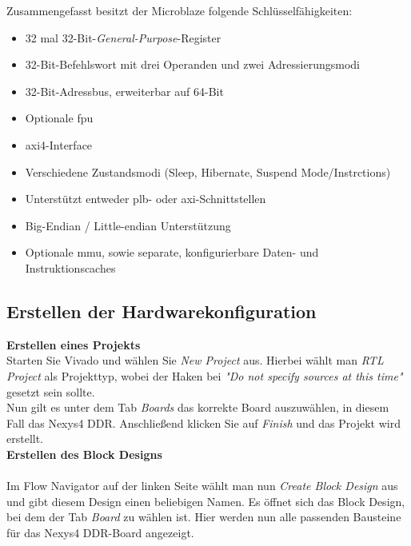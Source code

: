 Zusammengefasst besitzt der Microblaze folgende Schlüsselfähigkeiten:
\begin{itemize}
  \item 32 mal 32-Bit-\emph{General-Purpose}-Register
  \item 32-Bit-Befehlswort mit drei Operanden und zwei Adressierungsmodi
  \item 32-Bit-Adressbus, erweiterbar auf 64-Bit
  \item Optionale \ac{fpu}
  \item \ac{axi}4-Interface
  \item Verschiedene Zustandsmodi (Sleep, Hibernate, Suspend Mode/Instrctions)
  \item Unterstützt entweder \ac{plb}- oder \ac{axi}-Schnittstellen
  \item Big-Endian / Little-endian Unterstützung
  \item Optionale \ac{mmu}, sowie separate, konfigurierbare Daten- und Instruktionscaches
\end{itemize}


\subsection{Erstellen der Hardwarekonfiguration}\label{kap:microblazehardware}


\textbf{Erstellen eines Projekts}\\

Starten Sie Vivado und wählen Sie \emph{New Project} aus.
Hierbei wählt man \emph{RTL Project} als Projekttyp, wobei der Haken bei \emph{"Do not specify sources at this time"} gesetzt sein sollte.\\
Nun gilt es unter dem Tab \emph{Boards} das korrekte Board auszuwählen, in diesem Fall das Nexys4 DDR.
Anschließend klicken Sie auf \emph{Finish} und das Projekt wird erstellt.\\


\newpage
\textbf{Erstellen des Block Designs}\\\\
Im Flow Navigator  auf der linken Seite wählt man nun \emph{Create Block Design} aus und
 gibt diesem Design einen beliebigen Namen.
Es öffnet sich das Block Design, bei dem der Tab \emph{Board} zu wählen ist. Hier werden nun
alle passenden Bausteine für das Nexys4 DDR-Board angezeigt.\\\\

